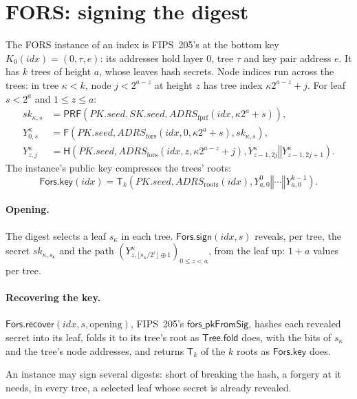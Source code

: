 \documentclass[11pt]{article}
\newcommand{\PRF}{\mathsf{PRF}}
\newcommand{\concat}{\mathbin\Vert}
\newcommand{\pkseed}{\mathit{PK.seed}}
\newcommand{\skseed}{\mathit{SK.seed}}
\newcommand{\addr}{\mathit{ADRS}}
\newcommand{\idx}{\mathit{idx}}
\newcommand{\TreeFold}{\mathsf{Tree.fold}}
\newcommand{\ForsKey}{\mathsf{Fors.key}}
\newcommand{\ForsSign}{\mathsf{Fors.sign}}
\newcommand{\ForsRec}{\mathsf{Fors.recover}}
\begin{document}
\section{FORS: signing the digest}
\label{sec:fts}

The FORS instance of an index is FIPS~205's at the bottom key $K_0(\idx)=(0,\tau,e)$: its addresses hold layer $0$, tree $\tau$ and key pair address $e$. It has $k$ trees of height $a$, whose leaves hash secrets. Node indices run across the trees: in tree $\kappa<k$, node $j<2^{a-z}$ at height $z$ has tree index $\kappa2^{a-z}+j$. For leaf $s<2^a$ and $1\leq z\leq a$:
\[
\begin{aligned}
  \mathit{sk}_{\kappa,s}&=\PRF\!\left(\pkseed,\skseed,\addr_{\mathrm{fprf}}(\idx,\kappa2^a+s)\right),\\
  Y^{\kappa}_{0,s}&=\mathsf F\!\left(\pkseed,\addr_{\mathrm{fors}}(\idx,0,\kappa2^a+s),\mathit{sk}_{\kappa,s}\right),\\
  Y^{\kappa}_{z,j}&=\mathsf H\!\left(\pkseed,\addr_{\mathrm{fors}}(\idx,z,\kappa2^{a-z}+j),Y^{\kappa}_{z-1,2j}\concat Y^{\kappa}_{z-1,2j+1}\right).
\end{aligned}
\]
The instance's public key compresses the trees' roots:
\[
  \ForsKey(\idx)=\mathsf T_k\!\left(\pkseed,\addr_{\mathrm{roots}}(\idx),Y^{0}_{a,0}\concat\cdots\concat Y^{k-1}_{a,0}\right).
\]

\paragraph{Opening.}
The digest selects a leaf $s_\kappa$ in each tree. $\ForsSign(\idx,s)$ reveals, per tree, the secret $\mathit{sk}_{\kappa,s_\kappa}$ and the path $(Y^{\kappa}_{z,\lfloor s_\kappa/2^z\rfloor\oplus1})_{0\leq z<a}$, from the leaf up: $1+a$ values per tree.

\paragraph{Recovering the key.}
$\ForsRec(\idx,s,\text{opening})$, FIPS~205's $\mathsf{fors\_pkFromSig}$, hashes each revealed secret into its leaf, folds it to its tree's root as $\TreeFold$ does, with the bits of $s_\kappa$ and the tree's node addresses, and returns $\mathsf T_k$ of the $k$ roots as $\ForsKey$ does.

An instance may sign several digests: short of breaking the hash, a forgery at it needs, in every tree, a selected leaf whose secret is already revealed.
\end{document}
